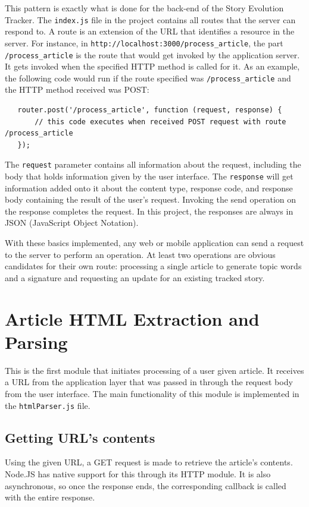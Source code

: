 \documentclass[11pt,titlepage]{report}
\begin{document}
This pattern is exactly what is done for the back-end of the Story Evolution Tracker. The \lstinline|index.js| file in the project contains all routes that the server can respond to. A route is an extension of the URL that identifies a resource in the server. For instance, in \lstinline|http://localhost:3000/process_article|, the part  \lstinline|/process_article| is the route that would get invoked by the application server. It gets invoked when the specified HTTP method is called for it. As an example, the following code would run if the route specified was \lstinline|/process_article| and the HTTP method received was POST:
\begin{lstlisting}
   router.post('/process_article', function (request, response) {
  	   // this code executes when received POST request with route /process_article
   });
\end{lstlisting}
The \lstinline|request| parameter contains all information about the request, including the body that holds information given by the user interface. The \lstinline|response| will get information added onto it about the content type, response code, and response body containing the result of the user's request. Invoking the send operation on the response completes the request. In this project, the responses are always in JSON (JavaScript Object Notation).

With these basics implemented, any web or mobile application can send a request to the server to perform an operation. At least two operations are obvious candidates for their own route: processing a single article to generate topic words and a signature and requesting an update for an existing tracked story.

\section{Article HTML Extraction and Parsing}
This is the first module that initiates processing of a user given article. It receives a URL from the application layer that was passed in through the request body from the user interface. The main functionality of this module is implemented in the \lstinline|htmlParser.js| file. 
\subsection{Getting URL's contents}
Using the given URL, a GET request is made to retrieve the article's contents. Node.JS has native support for this through its HTTP module. It is also asynchronous, so once the response ends, the corresponding callback is called with the entire response. 
\end{document}

